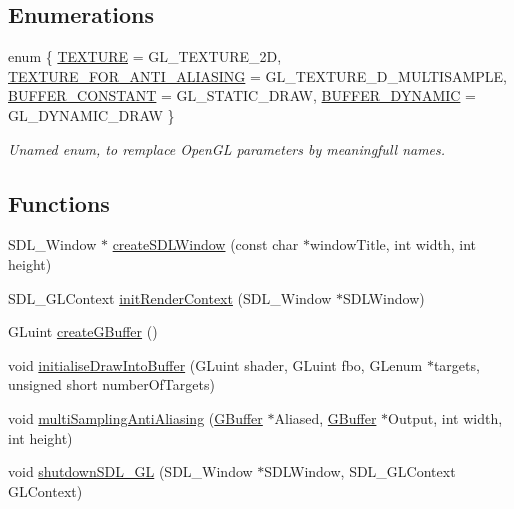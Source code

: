 \subsection*{Enumerations}
\begin{DoxyCompactItemize}
\item 
enum \{ \hyperlink{namespace_render_1_1_low_level_wrapper_a59e70fb6c29042051b300c88c0343f52a9a5e6a657b5b4f93f250ff999e4a355b}{T\+E\+X\+T\+U\+RE} = G\+L\+\_\+\+T\+E\+X\+T\+U\+R\+E\+\_\+2D, 
\hyperlink{namespace_render_1_1_low_level_wrapper_a59e70fb6c29042051b300c88c0343f52aca084a1a298f4b03cf1c59cac615419c}{T\+E\+X\+T\+U\+R\+E\+\_\+\+F\+O\+R\+\_\+\+A\+N\+T\+I\+\_\+\+A\+L\+I\+A\+S\+I\+NG} = G\+L\+\_\+\+T\+E\+X\+T\+U\+R\+E\+\_\+D\+\_\+\+M\+U\+L\+T\+I\+S\+A\+M\+P\+LE, 
\hyperlink{namespace_render_1_1_low_level_wrapper_a59e70fb6c29042051b300c88c0343f52a16fce7d878b09ca7c6085f81c0e1396e}{B\+U\+F\+F\+E\+R\+\_\+\+C\+O\+N\+S\+T\+A\+NT} = G\+L\+\_\+\+S\+T\+A\+T\+I\+C\+\_\+\+D\+R\+AW, 
\hyperlink{namespace_render_1_1_low_level_wrapper_a59e70fb6c29042051b300c88c0343f52a3fb7f9e003b932d76cdeaebd425b326f}{B\+U\+F\+F\+E\+R\+\_\+\+D\+Y\+N\+A\+M\+IC} = G\+L\+\_\+\+D\+Y\+N\+A\+M\+I\+C\+\_\+\+D\+R\+AW
 \}\begin{DoxyCompactList}\small\item\em Unamed enum, to remplace Open\+GL parameters by meaningfull names. \end{DoxyCompactList}
\end{DoxyCompactItemize}
\subsection*{Functions}
\begin{DoxyCompactItemize}
\item 
S\+D\+L\+\_\+\+Window $\ast$ \hyperlink{namespace_render_1_1_low_level_wrapper_ac8b1aade5f9ab4c69dad92a029877b9a}{create\+S\+D\+L\+Window} (const char $\ast$window\+Title, int width, int height)
\item 
S\+D\+L\+\_\+\+G\+L\+Context \hyperlink{namespace_render_1_1_low_level_wrapper_a09d5f6c9599e494c5923f0597f66ff09}{init\+Render\+Context} (S\+D\+L\+\_\+\+Window $\ast$S\+D\+L\+Window)
\item 
G\+Luint \hyperlink{namespace_render_1_1_low_level_wrapper_a3436b54e4bf188460ffc6e989ebd8131}{create\+G\+Buffer} ()
\item 
void \hyperlink{namespace_render_1_1_low_level_wrapper_a860448a754bcf84f87d9cf8c1eb14804}{initialise\+Draw\+Into\+Buffer} (G\+Luint shader, G\+Luint fbo, G\+Lenum $\ast$targets, unsigned short number\+Of\+Targets)
\item 
void \hyperlink{namespace_render_1_1_low_level_wrapper_ae47247689f51a034b4fe6cf1ef0ba820}{multi\+Sampling\+Anti\+Aliasing} (\hyperlink{struct_render_1_1_low_level_wrapper_1_1_g_buffer}{G\+Buffer} $\ast$Aliased, \hyperlink{struct_render_1_1_low_level_wrapper_1_1_g_buffer}{G\+Buffer} $\ast$Output, int width, int height)
\item 
void \hyperlink{namespace_render_1_1_low_level_wrapper_a88218ae7b3a3d43437d8f641feaf108a}{shutdown\+S\+D\+L\+\_\+\+GL} (S\+D\+L\+\_\+\+Window $\ast$S\+D\+L\+Window, S\+D\+L\+\_\+\+G\+L\+Context G\+L\+Context)
\end{DoxyCompactItemize}



